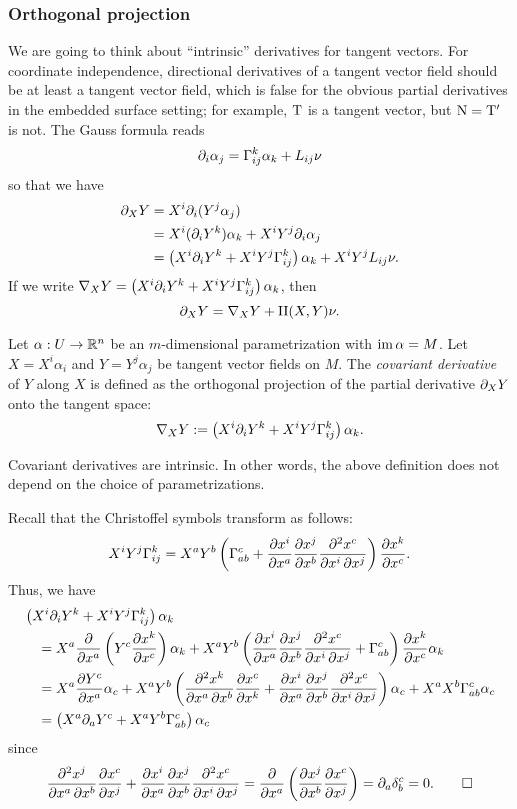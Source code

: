 \documentclass{../exp}
\def\a{\alpha}
\def\II{\mathrm{II}}
\begin{document}
\subsubsection{Orthogonal projection}
We are going to think about ``intrinsic'' derivatives for tangent vectors.
For coordinate independence, directional derivatives of a tangent vector field should be at least a tangent vector field, which is false for the obvious partial derivatives in the embedded surface setting; for example, $\mathrm{T}$ is a tangent vector, but $\mathrm{N}=\mathrm{T}'$ is not.
The Gauss formula reads
\[\pd_i\a_j=\Gamma_{ij}^k\a_k+L_{ij}\nu\]
so that we have
\begin{align*}
\pd_XY
&=X^i\pd_i(Y^j\a_j)\\
&=X^i(\pd_iY^k)\a_k+X^iY^j\pd_i\a_j\\
&=\left(X^i\pd_iY^k+X^iY^j\Gamma_{ij}^k\right)\a_k+X^iY^jL_{ij}\nu.
\end{align*}
If we write $\del_XY=\left(X^i\pd_iY^k+X^iY^j\Gamma_{ij}^k\right)\a_k$, then
\[\pd_XY=\del_XY+\II(X,Y)\nu.\]

\begin{defn}
Let $\a:U\to\R^n$ be an $m$-dimensional parametrization with $\im\a=M$.
Let $X=X^i\a_i$ and $Y=Y^j\a_j$ be tangent vector fields on $M$.
The \emph{covariant derivative} of $Y$ along $X$ is defined as the orthogonal projection of the partial derivative $\pd_XY$ onto the tangent space:
\[\del_XY:=\left(X^i\pd_iY^k+X^iY^j\Gamma_{ij}^k\right)\a_k.\]
\end{defn}

\begin{prop}
Covariant derivatives are intrinsic.
In other words, the above definition does not depend on the choice of parametrizations.
\end{prop}
\begin{pf}
Recall that the Christoffel symbols transform as follows:
\[X^iY^j\Gamma_{ij}^k=X^aY^b\left(\Gamma_{ab}^c+\pd{x^i}{x^a}\pd{x^j}{x^b}\pd[2]{x^c}{x^i}{x^j}\right)\pd{x^k}{x^c}.\]
Thus, we have
\begin{align*}
&\left(X^i\pd_iY^k+X^iY^j\Gamma_{ij}^k\right)\a_k\\
&\quad=X^a\pd{x^a}\left(Y^c\pd{x^k}{x^c}\right)\a_k+X^aY^b\left(\pd{x^i}{x^a}\pd{x^j}{x^b}\pd[2]{x^c}{x^i}{x^j}+\Gamma_{ab}^c\right)\pd{x^k}{x^c}\a_k\\
&\quad=X^a\pd{Y^c}{x^a}\a_c+X^aY^b\left(\pd[2]{x^k}{x^a}{x^b}\pd{x^c}{x^k}+\pd{x^i}{x^a}\pd{x^j}{x^b}\pd[2]{x^c}{x^i}{x^j}\right)\a_c+X^aX^b\Gamma_{ab}^c\a_c\\
&\quad=\left(X^a\pd_aY^c+X^aY^b\Gamma_{ab}^c\right)\a_c
\end{align*}
since
\[\pd[2]{x^j}{x^a}{x^b}\pd{x^c}{x^j}+\pd{x^i}{x^a}\pd{x^j}{x^b}\pd[2]{x^c}{x^i}{x^j}=\pd{x^a}\left(\pd{x^j}{x^b}\pd{x^c}{x^j}\right)=\pd_a\delta_b^c=0.\qedhere\]
\end{pf}
\end{document}
